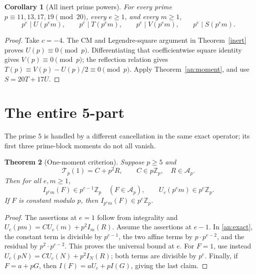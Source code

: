 \documentclass[11pt,a4paper]{article}
\newtheorem{theorem}{Theorem}[section]
\newtheorem{corollary}[theorem]{Corollary}
\theoremstyle{remark}\newtheorem{remark}[theorem]{Remark}
\newcommand{\Z}{\mathbb Z}
\begin{document}
\begin{corollary}[All inert prime powers]\label{an:inert}
For every prime \(p\equiv11,13,17,19\pmod{20}\), every \(e\ge1\),
and every \(m\ge1\),
\[
 p^e\mid U(p^em),\qquad p^e\mid T(p^em),\qquad
 p^e\mid V(p^em),\qquad \boxed{p^e\mid S(p^em)}.
\]
\end{corollary}
\begin{proof}
Take \(c=-4\). The CM and Legendre-square argument in
Theorem~\ref{inert} proves \(U(p)\equiv0\pmod p\).
Differentiating that coefficientwise square identity gives
\(V(p)\equiv0\pmod p\); the reflection relation gives
\(T(p)\equiv V(p)-U(p)/2\equiv0\pmod p\).
Apply Theorem~\ref{an:moment}, and use \(S=20T+17U\).
\end{proof}

\section{The entire 5-part}\label{sec:five}

The prime \(5\) is handled by a different cancellation in the same
exact operator; its first three prime-block moments do not all vanish.

\begin{theorem}[One-moment criterion]\label{five:criterion}
Suppose \(p\ge5\) and
\[
 \mathcal T_p(1)=C+p^2R,\qquad C\in p\Z_p,\quad R\in\mathcal A_p.
\]
Then for all \(e,m\ge1\),
\[
 I_{p^em}(F)\in p^{e-1}\Z_p\quad(F\in\mathcal A_p),\qquad
 U_c(p^em)\in p^e\Z_p.
\]
If \(F\) is constant modulo \(p\), then \(I_{p^em}(F)\in p^e\Z_p\).
\end{theorem}
\begin{proof}
The assertions at \(e=1\) follow from integrality and
\(U_c(pm)=CU_c(m)+p^2I_m(R)\).
Assume the assertions at \(e-1\). In \eqref{an:exact}, the constant
term is divisible by \(p^{e-1}\), the two affine terms by
\(p\cdot p^{e-2}\), and the residual by \(p^2\cdot p^{e-2}\).
This proves the universal bound at \(e\). For \(F=1\), use instead
\(U_c(pN)=CU_c(N)+p^2I_N(R)\); both terms are divisible by \(p^e\).
Finally, if \(F=a+pG\), then \(I(F)=aU_c+pI(G)\), giving the last claim.
\end{proof}
\end{document}

